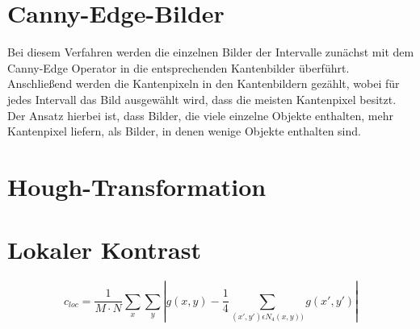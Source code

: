 \section{Canny-Edge-Bilder}
Bei diesem Verfahren werden die einzelnen Bilder der Intervalle zunächst mit dem Canny-Edge Operator in die entsprechenden Kantenbilder überführt. Anschließend werden die Kantenpixeln in den Kantenbildern gezählt, wobei für jedes Intervall das Bild ausgewählt wird, dass die meisten Kantenpixel besitzt.\\

Der Ansatz hierbei ist, dass Bilder, die viele einzelne Objekte enthalten, mehr Kantenpixel liefern, als Bilder, in denen wenige Objekte enthalten sind.

\section{Hough-Transformation}

\section{Lokaler Kontrast}
\begin{equation*}
c_{loc} = \frac{1}{M \cdot N}\sum_{x}^{{}} \sum_{y}^{{}} \left | g(x, y) - \frac{1}{4} \sum_{(x', y') \epsilon N_4(x, y))}^{{}} g(x', y') \right |
\end{equation*}
	


